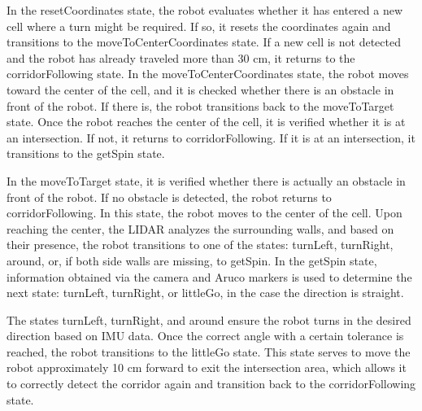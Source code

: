 In the resetCoordinates state, the robot evaluates whether it has entered a new cell where a turn might be required. If so, it resets the coordinates again and transitions to the moveToCenterCoordinates state. If a new cell is not detected and the robot has already traveled more than 30 cm, it returns to the corridorFollowing state. In the moveToCenterCoordinates state, the robot moves toward the center of the cell, and it is checked whether there is an obstacle in front of the robot. If there is, the robot transitions back to the moveToTarget state. Once the robot reaches the center of the cell, it is verified whether it is at an intersection. If not, it returns to corridorFollowing. If it is at an intersection, it transitions to the getSpin state.

In the moveToTarget state, it is verified whether there is actually an obstacle in front of the robot. If no obstacle is detected, the robot returns to corridorFollowing. In this state, the robot moves to the center of the cell. Upon reaching the center, the LIDAR analyzes the surrounding walls, and based on their presence, the robot transitions to one of the states: turnLeft, turnRight, around, or, if both side walls are missing, to getSpin. In the getSpin state, information obtained via the camera and Aruco markers is used to determine the next state: turnLeft, turnRight, or littleGo, in the case the direction is straight.

The states turnLeft, turnRight, and around ensure the robot turns in the desired direction based on IMU data. Once the correct angle with a certain tolerance is reached, the robot transitions to the littleGo state. This state serves to move the robot approximately 10 cm forward to exit the intersection area, which allows it to correctly detect the corridor again and transition back to the corridorFollowing state.


